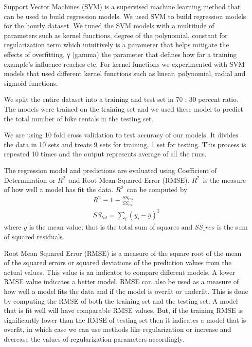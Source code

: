 \documentclass[12pt]{article}
\newcommand{\rtt}{${\mathit R}^2$}
\begin{document}

Support Vector Machines (SVM) is a supervised machine learning method that can
be used to build regression models.  We used SVM to build regression models for
the hourly dataset. We tuned the SVM models with a multitude of parameters such
as kernel functions, degree of the polynomial, constant for regularization term
which intuitively is a parameter that helps mitigate the effects of
overfitting, γ (gamma) the parameter that defines how far a training example's
influence reaches etc. For kernel functions we experimented with SVM models
that used different kernel functions such as linear, polynomial, radial and
sigmoid functions.

		





We split the entire dataset into a training and test set in 70 : 30 percent
ratio. The models were trained on the training set and we used these model to
predict the total number of bike rentals in the testing set.


We are using 10 fold cross validation to test accuracy of our models. It
divides the data in 10 sets and treats 9 sets for training, 1 set for
testing. This process is repeated 10 times and the output represents average of
all the runs.


The regression model and predictions are evaluated using Coefficient of
Determination or \rtt\ and Root Mean Squared Error (RMSE).  \rtt\ is the
measure of how well a model has fit the data. \rtt\ can be computed by
\begin{equation}
\begin{gathered}
R^2 \equiv 1 - \frac{SS_{res}}{SS_{tot}}\\
SS_{tot} = \sum_i(y_i - \overline{y})^2
\end{gathered}
\end{equation}
where $\overline{y}$ is the mean value; that is the total sum of squares and
$SS\_res$ is the sum of squared residuals.

Root Mean Squared Error (RMSE) is a measure of the square root of the mean of
the squared errors or squared deviations of the prediction values from the
actual values. This value is an indicator to compare different models. A lower
RMSE value indicates a better model.  RMSE can also be used as a measure of how
well a model fits the data and if the model is overfit or underfit. This is
done by computing the RMSE of both the training set and the testing set. A
model that is fit well will have comparable RMSE values. But, if the training
RMSE is significantly lower than the RMSE of testing set then it indicates a
model that is overfit, in which case we can use methods like regularization or
increase and decrease the values of regularization parameters accordingly.
\end{document}
